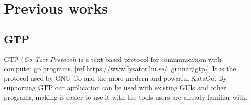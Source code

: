 \section{Previous works}

%
%

\subsection{GTP}

GTP (\textit{Go Text Protocol}) is a text based protocol for communication with
computer go programs. [ref https://www.lysator.liu.se/~gunnar/gtp/] It is the
protocol used by GNU Go and the more modern and powerful KataGo. By supporting
GTP our application can be used with existing GUIs and other programs, making
it easier to use it with the tools users are already familiar with.
